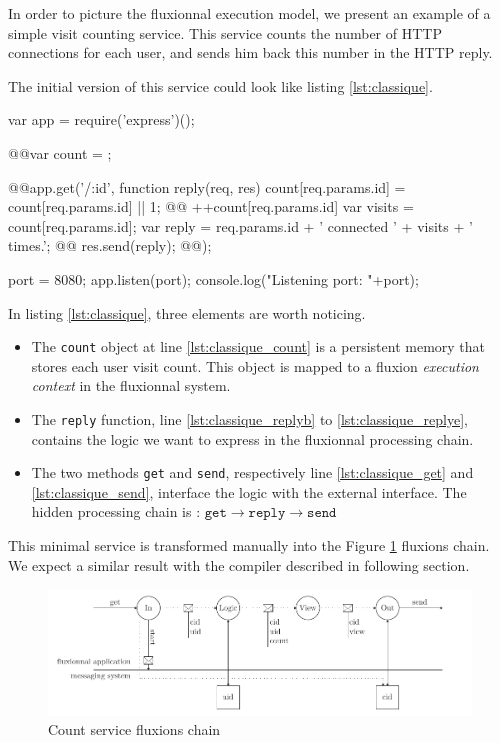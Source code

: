 In order to picture the fluxionnal execution model, we present an example of a simple visit counting service.
This service counts the number of HTTP connections for each user, and sends him back this number in the HTTP reply.

The initial version of this service could look like listing \ref{lst:classique}.

\begin{code}[Javascript, caption={Initial service},label={lst:classique}]
var app = require('express')();

@\label{lst:classique_count}@var count = {};

@\label{lst:classique_get}\label{lst:classique_replyb}@app.get('/:id', function reply(req, res){
  count[req.params.id] = count[req.params.id]  || 1; @\label{lst:classique_dynres}@
  ++count[req.params.id] 
  var visits = count[req.params.id];
  var reply = req.params.id + ' connected ' + visits + ' times.';
@\label{lst:classique_send}@  res.send(reply);
@\label{lst:classique_replye}@});

port = 8080;
app.listen(port);
console.log("Listening port: "+port);
\end{code}

In listing \ref{lst:classique}, three elements are worth noticing.

\begin{itemize}
  \item The \texttt{count} object at line \ref{lst:classique_count} is a persistent memory that stores each user visit count.
  This object is mapped to a fluxion \textit{execution context} in the fluxionnal system.
  \item The \texttt{reply} function, line \ref{lst:classique_replyb} to \ref{lst:classique_replye}, contains the logic we want to express in the fluxionnal processing chain.
  \item The two methods \texttt{get} and \texttt{send}, respectively line \ref{lst:classique_get} and \ref{lst:classique_send}, interface the logic with the external interface.
  The hidden processing chain is : $\texttt{get} \to \texttt{reply} \to \texttt{send}$
\end{itemize}

This minimal service is transformed manually into the Figure \ref{fig:fluxions} fluxions chain.
We expect a similar result with the compiler described in following section. 

\begin{figure}[h!]
  \includegraphics[width=\linewidth]{ressources/flux.pdf}
  \caption{Count service fluxions chain}
  \label{fig:fluxions}
\end{figure}

